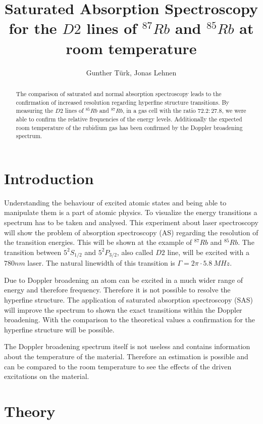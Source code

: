 \documentclass[]{article}
\title{Saturated Absorption Spectroscopy for the $D2$ lines of $^{87}Rb$ and $^{85}Rb$ at room temperature }
\author{Gunther T\"urk, Jonas Lehnen}
\begin{document}
\maketitle
\begin{abstract}
The comparison of saturated and normal absorption spectroscopy leads to the confirmation of increased resolution regarding hyperfine structure transitions.  
By measuring the $D2$ lines of $^{85}Rb$ and $^{87}Rb$, in a gas cell with the ratio $72.2 : 27.8$, we were able to confirm the relative frequencies of the energy levels. Additionally the expected room temperature of the rubidium gas has been confirmed by the Doppler broadening spectrum.
\end{abstract}

\newpage
\tableofcontents



\newpage
\section{Introduction}
Understanding the behaviour of excited atomic states and being able to manipulate them is a part of atomic physics. To visualize the energy transitions a spectrum has to be taken and analysed. 
This experiment about laser spectroscopy will show the problem of absorption spectroscopy (AS) regarding the resolution of the transition energies. This will be shown at the example of $^{87}Rb$ and $^{85}Rb$. The transition between $5^2S_{1/2}$ and $5^2P_{3/2}$, also called $D2$ line, will be excited with a $780nm$ laser. The natural linewidth of this transition is $\Gamma = 2\pi \cdot 5.8\ MHz$.

Due to Doppler broadening an atom can be excited in a much wider range of energy and therefore frequency. Therefore it is not possible to resolve the hyperfine structure. The application of saturated absorption spectroscopy (SAS) will improve the spectrum to shown the exact transitions within the Doppler broadening. With the comparison to the theoretical values a confirmation for the hyperfine structure will be possible.

The Doppler broadening spectrum itself is not useless and contains information about the temperature of the material. Therefore an estimation is possible and can be compared to the room temperature to see the effects of the driven excitations on the material.



\newpage
\section{Theory}
\end{document}
